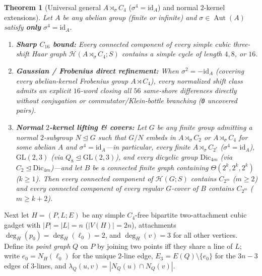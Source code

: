 \documentclass[11pt]{amsart}
\newtheorem{theorem}{Theorem}[section]
\theoremstyle{definition}
\theoremstyle{remark}
\newcommand{\Haar}{\mathcal{H}}
\newcommand{\Aut}{\operatorname{Aut}}
\newcommand{\id}{\mathrm{id}}
\begin{document}
\begin{theorem}[Universal general $A \rtimes_\sigma C_4$ ($\sigma^4 = \id_A$) and normal $2$-kernel extensions]\label{thm:semidirect_c4}
Let $A$ be any abelian group (finite or infinite) and $\sigma \in \Aut(A)$ satisfy \textbf{only} $\sigma^4 = \id_A$.
\begin{enumerate}[label=(\alph*)]
\item \textbf{Sharp $C_{16}$ bound:} Every connected component of every simple cubic three-shift Haar graph $\Haar(A \rtimes_\sigma C_4; S)$ contains a simple cycle of length $4, 8$, or $16$.
\item \textbf{Gaussian / Frobenius direct refinement:} When $\sigma^2 = -\id_A$ (covering every abelian-kernel Frobenius group $A \rtimes C_4$), every normalized shift class admits an explicit $16$-word closing all $56$ same-shore differences directly without conjugation or commutator/Klein-bottle branching (\texttt{0} uncovered pairs).
\item \textbf{Normal $2$-kernel lifting \& covers:} Let $G$ be any finite group admitting a normal $2$-subgroup $N \trianglelefteq G$ such that $G/N$ embeds in $A \rtimes_\sigma C_2$ or $A \rtimes_\sigma C_4$ for some abelian $A$ and $\sigma^4 = \id_A$---in particular, every finite $A \rtimes_\sigma C_{2^r}$ ($\sigma^4 = \id_A$), $\mathrm{GL}(2,3)$ (via $Q_8 \trianglelefteq \mathrm{GL}(2,3)$), and every dicyclic group $\mathrm{Dic}_{4m}$ (via $C_2 \trianglelefteq \mathrm{Dic}_{4m}$)---and let $B$ be a connected finite graph containing $\Theta(2^k, 2^k, 2^k)$ ($k \ge 1$). Then every connected component of $\Haar(G; S)$ contains $C_{2^m}$ ($m \ge 2$) and every connected component of every regular $G$-cover of $B$ contains $C_{2^m}$ ($m \ge k+2$).
\end{enumerate}
\end{theorem}

Next let $H = (P, L; E)$ be any simple $C_4$-free bipartite two-attachment cubic gadget with $|P| = |L| = n$ ($|V(H)| = 2n$), attachments $\deg_H(p_0) = \deg_H(\ell_0) = 2$, and $\deg_H(v) = 3$ for all other vertices. Define its \emph{point graph} $Q$ on $P$ by joining two points iff they share a line of $L$; write $e_0 = N_H(\ell_0)$ for the unique $2$-line edge, $E_3 = E(Q) \setminus \{e_0\}$ for the $3n - 3$ edges of $3$-lines, and $\lambda_Q(u, v) = |N_Q(u) \cap N_Q(v)|$.
\end{document}
